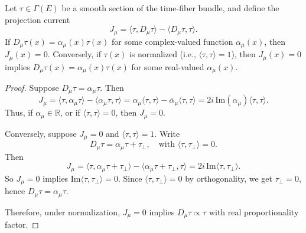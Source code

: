\documentclass[10pt,a4paper]{amsart}
\begin{document}
\begin{theorem}
Let \( \tau \in \Gamma(E) \) be a smooth section of the time-fiber bundle, and define the projection current
\[
J_\mu = \langle \tau, D_\mu \tau \rangle - \langle D_\mu \tau, \tau \rangle.
\]
If \( D_\mu \tau(x) = \alpha_\mu(x) \tau(x) \) for some complex-valued function \( \alpha_\mu(x) \), then \( J_\mu(x) = 0 \). Conversely, if \( \tau(x) \) is normalized (i.e., \( \langle \tau, \tau \rangle = 1 \)), then \( J_\mu(x) = 0 \) implies \( D_\mu \tau(x) = \alpha_\mu(x) \tau(x) \) for some real-valued \( \alpha_\mu(x) \).
\end{theorem}

\begin{proof}
Suppose \( D_\mu \tau = \alpha_\mu \tau \). Then
\[
J_\mu = \langle \tau, \alpha_\mu \tau \rangle - \langle \alpha_\mu \tau, \tau \rangle = \alpha_\mu \langle \tau, \tau \rangle - \bar{\alpha}_\mu \langle \tau, \tau \rangle = 2i\, \mathrm{Im}(\alpha_\mu) \langle \tau, \tau \rangle.
\]
Thus, if \( \alpha_\mu \in \mathbb{R} \), or if \( \langle \tau, \tau \rangle = 0 \), then \( J_\mu = 0 \).

Conversely, suppose \( J_\mu = 0 \) and \( \langle \tau, \tau \rangle = 1 \). Write
\[
D_\mu \tau = \alpha_\mu \tau + \tau_\perp, \quad \text{with } \langle \tau, \tau_\perp \rangle = 0.
\]
Then
\[
J_\mu = \langle \tau, \alpha_\mu \tau + \tau_\perp \rangle - \langle \alpha_\mu \tau + \tau_\perp, \tau \rangle = 2i\, \mathrm{Im} \langle \tau, \tau_\perp \rangle.
\]
So \( J_\mu = 0 \) implies \( \mathrm{Im} \langle \tau, \tau_\perp \rangle = 0 \). Since \( \langle \tau, \tau_\perp \rangle = 0 \) by orthogonality, we get \( \tau_\perp = 0 \), hence \( D_\mu \tau = \alpha_\mu \tau \).

Therefore, under normalization, \( J_\mu = 0 \) implies \( D_\mu \tau \propto \tau \) with real proportionality factor.
\end{proof}
\end{document}
